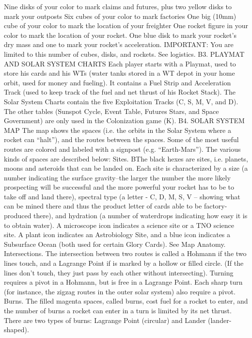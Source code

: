 \documentclass[a4paper]{book}
\begin{document}
Nine disks of your color to mark claims and futures, plus two yellow disks to mark your outposts
Six cubes of your color to mark factories
One big (10mm) cube of your color to mark the location of your freighter
One rocket figure in your color to mark the location of your rocket.
One blue disk to mark your rocket’s dry mass and one to mark your rocket’s acceleration.
IMPORTANT: You are limited to this number of cubes, disks, and rockets. See logistics.
B3. PLAYMAT AND SOLAR SYSTEM CHARTS
Each player starts with a Playmat, used to store his cards and his WTs (water tanks stored in a WT depot in your home orbit, used for money and fueling). It contains a Fuel Strip and Acceleration Track (used to keep track of the fuel and net thrust of his Rocket Stack).
The Solar System Charts contain the five Exploitation Tracks (C, S, M, V, and D). The other tables (Sunspot Cycle, Event Table, Futures Stars, and Space Government) are only used in the Colonization game (K).
B4. SOLAR SYSTEM MAP
The map shows the spaces (i.e. the orbits in the Solar System where a rocket can “halt”), and the routes between the spaces. Some of the most useful routes are colored and labeled with a signpost (e.g. “Earth-Mars”). The various kinds of spaces are described below:
Sites. BThe black hexes are sites, i.e. planets, moons and asteroids that can be landed on. Each site is characterized by a size (a number indicating the surface gravity--the larger the number the more likely prospecting will be successful and the more powerful your rocket has to be to take off and land there), spectral type (a letter - C, D, M, S, V – showing what can be mined there and thus the product letter of cards able to be factory-produced there), and hydration (a number of waterdrops indicating how easy it is to obtain water). A microscope icon indicates a science site or a TNO science site. A plant icon indicates an Astrobiology Site, and a blue icon indicates a Subsurface Ocean (both used for certain Glory Cards). See Map Anatomy.
 Intersections. The intersection between two routes is called a Hohmann if the two lines touch, and a Lagrange Point if is marked by a hollow or filled circle. (If the lines don’t touch, they just pass by each other without intersecting). Turning requires a pivot in a Hohmann, but is free in a Lagrange Point. Each sharp turn (for instance, the zigzag routes in the outer solar system) also require a pivot.
Burns. The filled magenta spaces, called burns, cost fuel for a rocket to enter, and the number of burns a rocket can enter in a turn is limited by its net thrust. There are two types of burns: Lagrange Point (circular) and Lander (lander-shaped).
\end{document}

